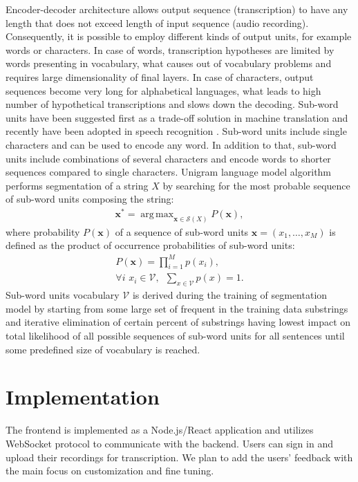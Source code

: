 \documentclass[12pt,a4paper]{article}
\DeclareMathOperator*{\argmax}{arg\,max}
\begin{document}
Encoder-decoder architecture allows output sequence (transcription)
to have any length that does not exceed length of input sequence (audio recording).
Consequently, it is possible to employ different kinds of output units,
for example words or characters. In case of words,
transcription hypotheses are limited by words presenting in vocabulary,
what causes out of vocabulary problems and requires
large dimensionality of final layers.
In case of characters, output sequences become very long
for alphabetical languages, what leads to
high number of hypothetical transcriptions
and slows down the decoding.
Sub-word units have been suggested first as a trade-off solution in
machine translation \cite{sennrich2015neural} and recently have been adopted in speech recognition \cite{zeyer2018improved}.
Sub-word units include single characters and can be used to encode
any word. In addition to that, sub-word units include
combinations of several characters and encode
words to shorter sequences compared to single characters.
Unigram language model algorithm \cite{kudo2018subword}
performs segmentation of a string $X$ by searching for the most
probable sequence of sub-word units composing the string:
\begin{align}
\mathbf{x}^{*} = \argmax_{\mathbf{x} \in \mathcal{S}(X)} P(\mathbf{x}),
\end{align}
where probability $P(\mathbf{x})$ of a sequence of sub-word units
$\mathbf{x} = (x_1,\ldots,x_M)$
is defined as the product of occurrence probabilities of sub-word
units:
\begin{align}
  P(\mathbf{x}) = \prod_{i=1}^{M} p(x_i), \\
  \forall i\,\, x_i \in \mathcal{V},\,\,\,
  \sum_{x \in \mathcal{V}} p(x) = 1. \nonumber
\end{align}
Sub-word units vocabulary $\mathcal{V}$ is derived during
the training of segmentation model by starting
from some large set of frequent in the training data
substrings and iterative
elimination of certain percent of substrings having
lowest impact on total likelihood of all possible
sequences of sub-word units for all sentences 
until some predefined size of vocabulary is reached.

\section{Implementation}

The frontend is implemented as a Node.js/React application and utilizes WebSocket protocol
to communicate with the backend. Users can sign in and upload their recordings for transcription. 
We plan to add the users' feedback with the main focus on customization and fine tuning. 
\end{document}
